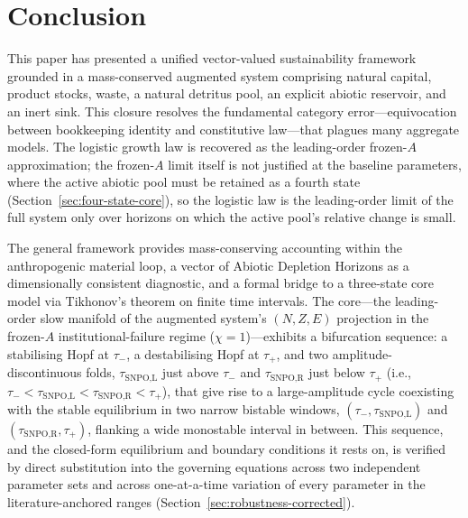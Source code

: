 \documentclass[twocolumn,10pt]{article}
\begin{document}
\section{Conclusion}
This paper has presented a unified vector-valued sustainability framework grounded in a mass-conserved augmented system comprising natural capital, product stocks, waste, a natural detritus pool, an explicit abiotic reservoir, and an inert sink. This closure resolves the fundamental category error---equivocation between bookkeeping identity and constitutive law---that plagues many aggregate models. The logistic growth law is recovered as the leading-order frozen-\(A\) approximation; the frozen-\(A\) limit itself is not justified at the baseline parameters, where the active abiotic pool must be retained as a fourth state (Section~\ref{sec:four-state-core}), so the logistic law is the leading-order limit of the full system only over horizons on which the active pool's relative change is small.

The general framework provides mass-conserving accounting within the anthropogenic material loop, a vector of Abiotic Depletion Horizons as a dimensionally consistent diagnostic, and a formal bridge to a three-state core model via Tikhonov's theorem on finite time intervals. The core---the leading-order slow manifold of the augmented system's \((N,Z,E)\) projection in the frozen-\(A\) institutional-failure regime (\(\chi = 1\))---exhibits a bifurcation sequence: a stabilising Hopf at \(\tau_-\), a destabilising Hopf at \(\tau_+\), and two amplitude-discontinuous folds, $\tau_{\text{SNPO,L}}$ just above $\tau_-$ and $\tau_{\text{SNPO,R}}$ just below $\tau_+$ (i.e., $\tau_-<\tau_{\text{SNPO,L}}<\tau_{\text{SNPO,R}}<\tau_+$), that give rise to a large-amplitude cycle coexisting with the stable equilibrium in two narrow bistable windows, $(\tau_-,\tau_{\text{SNPO,L}})$ and $(\tau_{\text{SNPO,R}},\tau_+)$, flanking a wide monostable interval in between. This sequence, and the closed-form equilibrium and boundary conditions it rests on, is verified by direct substitution into the governing equations across two independent parameter sets and across one-at-a-time variation of every parameter in the literature-anchored ranges (Section~\ref{sec:robustness-corrected}).
\end{document}
